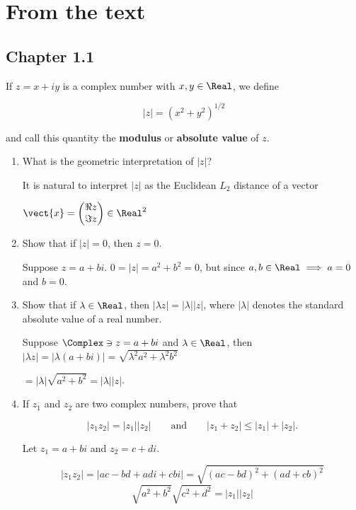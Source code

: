 \section{From the text}

\subsection{Chapter 1.1}

If $z=x+iy$ is a complex number with $x,y\in\Real$, we define

$$
|z| =\left(x^2+y^2\right)^{1/2}
$$

and call this quantity the \textbf{modulus} or \textbf{absolute value} of $z$.

\begin{enumerate}[label=(\alph*)]

    \item What is the geometric interpretation of $|z|$?

        It is natural to interpret $|z|$ as the Euclidean $L_2$ distance of a vector
        
        $\vect{x} = \begin{pmatrix}\Re{z} \\ \Im{z}\end{pmatrix} \in\Real^2$

    \item Show that if $|z|=0$, then $z=0$.

        Suppose $z=a+bi$. $0=|z|=a^2+b^2 = 0$, but since $a,b\in\Real
        \implies a =0$ and $b=0$.

    \item Show that if $\lambda\in\Real$, then $|\lambda z|=|\lambda||z|$, where
        $|\lambda|$ denotes the standard absolute value of a real number.

        Suppose $\Complex\ni z = a+bi$ and $\lambda\in\Real$, then
        $|\lambda z| = |\lambda (a+bi)| = \sqrt{\lambda^2 a^2+\lambda^2 b^2}$

        $=|\lambda|\sqrt{a^2+b^2}=|\lambda||z|$.

    \item If $z_1$ and $z_2$ are two complex numbers, prove that

        $$
        |z_1z_2|=|z_1||z_2|
        \quad\quad\text{and}\quad\quad
        |z_1+z_2|\leq |z_1|+|z_2|.
        $$

        Let $z_1 = a+bi$ and $z_2 = c+di$.

        $$
        |z_1z_2|=|ac - bd + adi + cbi|
        =
        \sqrt{(ac-bd)^2+(ad+cb)^2}
        $$
        $$
        \sqrt{a^2+b^2}\sqrt{c^2+d^2}
        =|z_1||z_2|
        $$


\end{enumerate}
